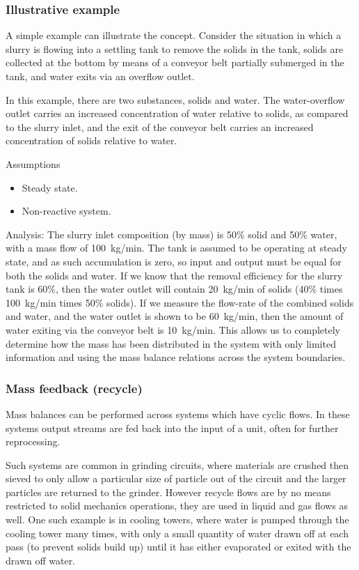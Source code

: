\subsubsection{Illustrative example}
A simple example can illustrate the concept. Consider the situation in which a slurry is flowing into a settling tank to remove the solids in the tank, solids are collected at the bottom by means of a conveyor belt partially submerged in the tank, and water exits via an overflow outlet.

In this example, there are two substances, solids and water. The water-overflow outlet carries an increased concentration of water relative to solids, as compared to the slurry inlet, and the exit of the conveyor belt carries an increased concentration of solids relative to water.

Assumptions
\begin{itemize}
\item Steady state.
\item Non-reactive system.
\end{itemize}
Analysis: The slurry inlet composition (by mass) is 50\% solid and 50\% water, with a mass flow of \SI{100}{kg/min}. The tank is assumed to be operating at steady state, and as such accumulation is zero, so input and output must be equal for both the solids and water. If we know that the removal efficiency for the slurry tank is 60\%, then the water outlet will contain \SI{20}{kg/min} of solids (40\% times \SI{100}{kg/min} times 50\% solids). If we measure the flow-rate of the combined solids and water, and the water outlet is shown to be \SI{60}{kg/min}, then the amount of water exiting via the conveyor belt is \SI{10}{kg/min}. This allows us to completely determine how the mass has been distributed in the system with only limited information and using the mass balance relations across the system boundaries.


\subsubsection{Mass feedback (recycle)}
Mass balances can be performed across systems which have cyclic flows. In these systems output streams are fed back into the input of a unit, often for further reprocessing.

Such systems are common in grinding circuits, where materials are crushed then sieved to only allow a particular size of particle out of the circuit and the larger particles are returned to the grinder. However recycle flows are by no means restricted to solid mechanics operations, they are used in liquid and gas flows as well. One such example is in cooling towers, where water is pumped through the cooling tower many times, with only a small quantity of water drawn off at each pass (to prevent solids build up) until it has either evaporated or exited with the drawn off water.

